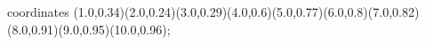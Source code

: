 					coordinates { (1.0,0.34)(2.0,0.24)(3.0,0.29)(4.0,0.6)(5.0,0.77)(6.0,0.8)(7.0,0.82)(8.0,0.91)(9.0,0.95)(10.0,0.96)};